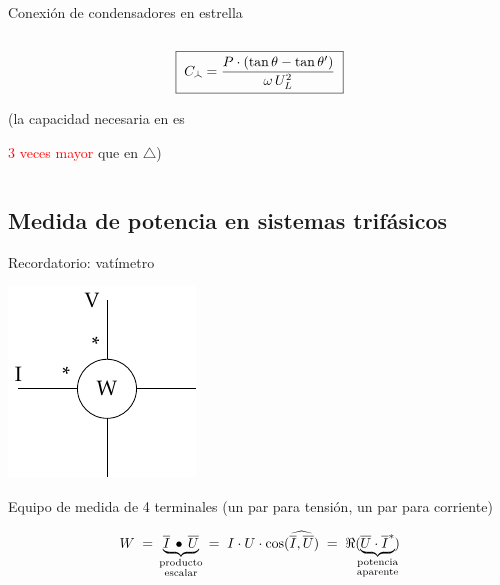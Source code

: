 \documentclass[aspectratio=169, usenames,svgnames,dvipsnames]{beamer}
\newcommand\wye{\scalerel*{\stackengine{-1pt}{%
  \rotatebox[origin=c]{30}{\rule{10pt}{.9pt}}\kern-1pt%
  \rotatebox[origin=c]{-30}{\rule{10pt}{1.3pt}}}{%
  \rule{.9pt}{10pt}}{O}{c}{F}{F}{S}}{\Delta}} %
\begin{document}
\begin{frame}{Conexión de condensadores en estrella}
\begin{columns}
\begin{column}{0.5\columnwidth}
        \vspace{2mm}
        \[
          \boxed{\; C_{\wye} = \frac{P\cdot(\tan \theta - \tan \theta')}{\omega \, U_L^2} \;}
        \]
        \begin{center}
            \small (la \alert{capacidad necesaria} en {\wye} es 
            
            \textcolor{red}{3 veces mayor} que en $\triangle$)
        \end{center}
    \end{column}
    \end{columns}
\end{frame}


\subsection{Medida de potencia en sistemas trifásicos}

\begin{frame}{Recordatorio: \hspace{3mm}vatímetro}
    \vspace{3mm}
    \begin{center}
        \includegraphics[height=0.5\textheight]{../figs/vatimetro.pdf}
    \end{center}

    \vspace{2mm}
    
    \centering Equipo de medida de \alert{4 terminales} (un par para tensión, un par para corriente)

    \vspace{-4mm}
    \begin{equation*}
        W 
        \; = \, 
        \underbrace{ \overline{I}\,\bullet\,\overline{U} }_{\substack{\text{producto} \\ \text{escalar}}} 
        \, = \;  
        I\cdot U\cdot \cos(\widehat{\overline{I}, \overline{U}})
        \; = \;
        \Re( \hspace{-1mm} \underbrace{\overline{U} \cdot \overline{I}^*}_{\substack{\text{potencia} \\ \text{aparente}}} \hspace{-1mm})
	\end{equation*}
\end{frame}
\end{document}
